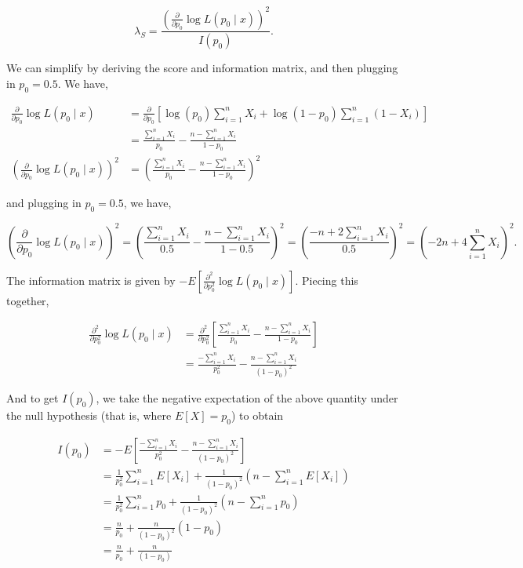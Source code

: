 \documentclass[
  letterpaper,
  DIV=11,
  numbers=noendperiod]{scrreprt}
\begin{document}
\[
\lambda_S = \frac{\left( \frac{\partial}{\partial p_0} \log L(p_0 \mid x) \right)^2}{I(p_0)}.
\]

We can simplify by deriving the score and information matrix, and then
plugging in \(p_0 = 0.5\). We have,

\begin{align*}
\frac{\partial}{\partial p_0} \log L(p_0 \mid x) & = \frac{\partial}{\partial p_0} \left[ \log(p_0) \sum_{i = 1}^n X_i + \log(1 - p_0) \sum_{i = 1}^n (1 - X_i) \right] \\
& = \frac{\sum_{i = 1}^n X_i}{p_0} - \frac{n - \sum_{i = 1}^n  X_i}{1 - p_0} \\
\left( \frac{\partial}{\partial p_0} \log L(p_0 \mid x) \right)^2 & = \left(\frac{\sum_{i = 1}^n X_i}{p_0} - \frac{n - \sum_{i = 1}^n  X_i}{1 - p_0} \right)^2
\end{align*}

and plugging in \(p_0 = 0.5\), we have,

\[
\left( \frac{\partial}{\partial p_0} \log L(p_0 \mid x)\right)^2 = \left(\frac{\sum_{i = 1}^n X_i}{0.5} - \frac{n - \sum_{i = 1}^n  X_i}{1 - 0.5} \right)^2 = \left( \frac{-n + 2\sum_{i = 1}^n X_i}{0.5}\right)^2 = \left( -2n + 4\sum_{i = 1}^n X_i\right)^2.
\]

The information matrix is given by
\(-E\left[ \frac{\partial^2}{\partial p_0^2} \log L(p_0 \mid x)\right]\).
Piecing this together,

\begin{align*}
 \frac{\partial^2}{\partial p_0^2} \log L(p_0 \mid x) 
& =  \frac{\partial^2}{\partial p_0^2} \left[ \frac{\sum_{i = 1}^n X_i}{p_0} - \frac{n - \sum_{i = 1}^n  X_i}{1 - p_0} \right] \\
& = \frac{-\sum_{i = 1}^n X_i}{p_0^2} - \frac{n - \sum_{i = 1}^n  X_i}{(1 - p_0)^2} 
\end{align*}

And to get \(I(p_0)\), we take the negative expectation of the above
quantity under the null hypothesis (that is, where \(E[X] = p_0\)) to
obtain

\begin{align*}
    I(p_0) & = -E \left[ \frac{-\sum_{i = 1}^n X_i}{p_0^2} - \frac{n - \sum_{i = 1}^n  X_i}{(1 - p_0)^2} \right] \\
    & = \frac{1}{p_0^2} \sum_{i = 1}^n E[X_i] + \frac{1}{(1 - p_0)^2} \left( n - \sum_{i = 1}^n E[X_i]\right) \\
    & = \frac{1}{p_0^2} \sum_{i = 1}^n p_0 + \frac{1}{(1 - p_0)^2} \left( n - \sum_{i = 1}^n p_0\right) \\
    & = \frac{n}{p_0}  + \frac{n}{(1 - p_0)^2} \left( 1 - p_0\right) \\
    & = \frac{n}{p_0}  + \frac{n}{(1 - p_0)}
\end{align*}
\end{document}
